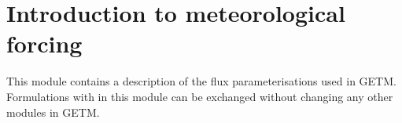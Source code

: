 
\section{Introduction to meteorological forcing}

This module contains a description of the flux parameterisations
used in GETM. Formulations with in this module can be exchanged 
without changing any other modules in GETM.
